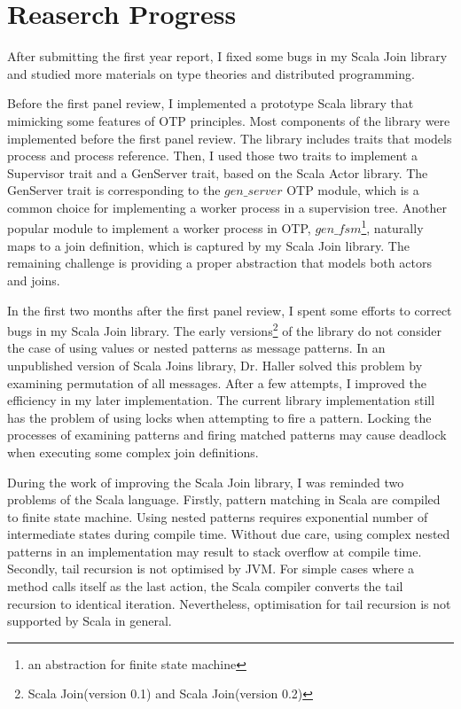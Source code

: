 \section{Reaserch Progress}

After submitting the first year report, I fixed some bugs in my Scala Join library and studied more materials on type theories and distributed programming.

Before the first panel review, I implemented a prototype Scala library that mimicking some features of OTP principles.  Most components of the library were implemented before the first panel review.  The library includes traits that models process and process reference.  Then, I used those two traits to implement a Supervisor trait and a GenServer trait, based on the Scala Actor library.  The GenServer trait is corresponding to the $gen\_server$ OTP module, which is a common choice for implementing a worker process in a supervision tree.  Another popular module to implement a worker process in OTP, $gen\_fsm$\footnote{an abstraction for finite state machine}, naturally maps to a join definition, which is captured by my Scala Join library.  The remaining challenge is providing a proper abstraction that models both actors and joins.

In the first two months after the first panel review, I spent some efforts to correct bugs in my Scala Join library.  The early versions\footnote{Scala Join(version 0.1) and Scala Join(version 0.2)} of the library do not consider the case of using values or nested patterns as message patterns.  In an unpublished version of Scala Joins library, Dr. Haller solved this problem by examining permutation of all messages.  After a few attempts, I improved the efficiency in my later implementation.  The current library implementation still has the problem of using locks when attempting to fire a pattern.  Locking the processes of examining patterns and firing matched patterns may cause deadlock when executing some complex join definitions.

During the work of improving the Scala Join library, I was reminded two problems of the Scala language.  Firstly, pattern matching in Scala are compiled to finite state machine.   Using nested patterns requires exponential number of intermediate states during compile time.   Without due care, using complex nested patterns in an implementation may result to stack overflow at compile time.  Secondly, tail recursion is not optimised by JVM.  For simple cases where a method calls itself as the last action, the Scala compiler converts the tail recursion to identical iteration.  Nevertheless, optimisation for tail recursion is not supported by Scala in general.

